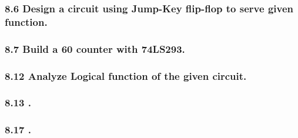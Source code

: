     \subsubsection{8.6 \textnormal{Design a circuit using Jump-Key flip-flop to serve given function}.}
    {\color{hwSolution}

        

    }

    \subsubsection{8.7 \textnormal{Build a 60 counter with 74LS293}.}
    {\color{hwSolution}

        

    }

    \subsubsection{8.12 \textnormal{Analyze Logical function of the given circuit}.}
    {\color{hwSolution}

    }

    \subsubsection{8.13 \textnormal{}.}
    {\color{hwSolution}

    }

    \subsubsection{8.17 \textnormal{}.}
    {\color{hwSolution}

    }